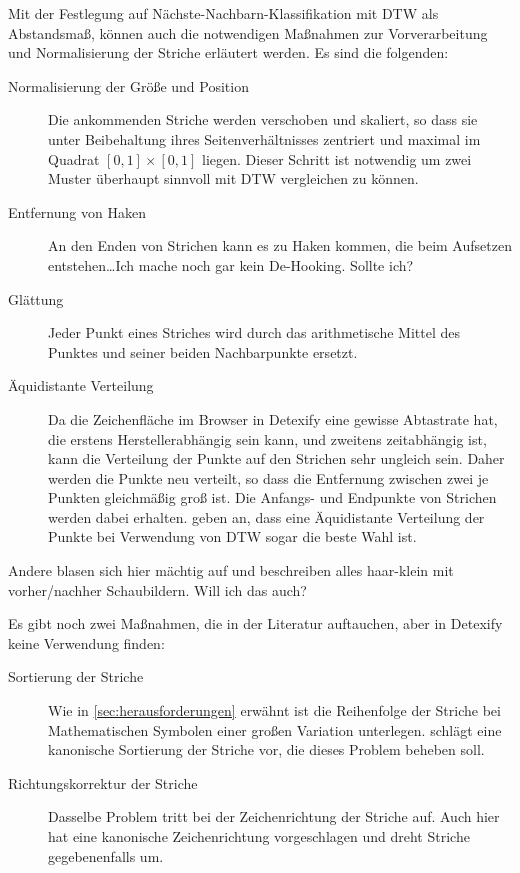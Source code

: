 Mit der Festlegung auf Nächste-Nachbarn-Klassifikation mit DTW als Abstandsmaß, können auch die notwendigen Maßnahmen zur Vorverarbeitung und Normalisierung der Striche erläutert werden. Es sind die folgenden:

\begin{description}
  \item[Normalisierung der Größe und Position]
  Die ankommenden Striche werden verschoben und skaliert, so dass sie unter Beibehaltung ihres Seitenverhältnisses zentriert und maximal im Quadrat \([0,1]\times[0,1]\) liegen. Dieser Schritt ist notwendig um zwei Muster überhaupt sinnvoll mit DTW vergleichen zu können.
  \item[Entfernung von Haken]
  \TODO An den Enden von Strichen kann es zu Haken kommen, die beim Aufsetzen entstehen\dots Ich mache noch gar kein De-Hooking. Sollte ich?
  \item[Glättung]
  Jeder Punkt eines Striches wird durch das arithmetische Mittel des Punktes und seiner beiden Nachbarpunkte ersetzt.
  \item[Äquidistante Verteilung] Da die Zeichenfläche im Browser in Detexify eine gewisse Abtastrate hat, die erstens Herstellerabhängig sein kann, und zweitens zeitabhängig ist, kann die Verteilung der Punkte auf den Strichen sehr ungleich sein. Daher werden die Punkte neu verteilt, so dass die Entfernung zwischen zwei je Punkten gleichmäßig groß ist. Die Anfangs- und Endpunkte von Strichen werden dabei erhalten. \citet{Golubitsky:2009p1842} geben an, dass eine Äquidistante Verteilung der Punkte bei Verwendung von DTW sogar die beste Wahl ist.
\end{description}

\TODO Andere blasen sich hier mächtig auf und beschreiben alles haar-klein mit vorher/nachher Schaubildern. Will ich das auch?

Es gibt noch zwei Maßnahmen, die in der Literatur auftauchen, aber in Detexify keine Verwendung finden:

\begin{description}
  \item[Sortierung der Striche] Wie in \ref{sec:herausforderungen} erwähnt ist die Reihenfolge der Striche bei Mathematischen Symbolen einer großen Variation unterlegen. \citet{Matasakis:1999p9465} schlägt eine kanonische Sortierung der Striche vor, die dieses Problem beheben soll.
  \item[Richtungskorrektur der Striche] Dasselbe Problem tritt bei der Zeichenrichtung der Striche auf. Auch hier hat \citet{Matasakis:1999p9465} eine kanonische Zeichenrichtung vorgeschlagen und dreht Striche gegebenenfalls um.
\end{description}

